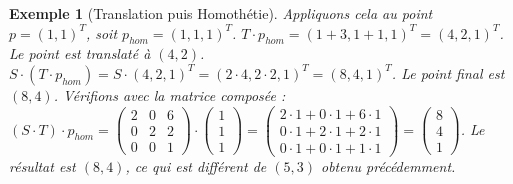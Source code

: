 \documentclass{article}
\newtheorem{example}{Exemple}
\begin{document}
\begin{example}[Translation puis Homothétie]
Appliquons cela au point $p = (1, 1)^T$, soit $p_{hom} = (1, 1, 1)^T$.
$T \cdot p_{hom} = (1+3, 1+1, 1)^T = (4, 2, 1)^T$. Le point est translaté à $(4, 2)$.
$S \cdot (T \cdot p_{hom}) = S \cdot (4, 2, 1)^T = (2\cdot4, 2\cdot2, 1)^T = (8, 4, 1)^T$. Le point final est $(8, 4)$.
Vérifions avec la matrice composée :
$(S \cdot T) \cdot p_{hom} = \begin{pmatrix} 2 & 0 & 6 \\ 0 & 2 & 2 \\ 0 & 0 & 1 \end{pmatrix} \cdot \begin{pmatrix} 1 \\ 1 \\ 1 \end{pmatrix} = \begin{pmatrix} 2\cdot1 + 0\cdot1 + 6\cdot1 \\ 0\cdot1 + 2\cdot1 + 2\cdot1 \\ 0\cdot1 + 0\cdot1 + 1\cdot1 \end{pmatrix} = \begin{pmatrix} 8 \\ 4 \\ 1 \end{pmatrix}$. Le résultat est $(8,4)$, ce qui est différent de $(5,3)$ obtenu précédemment.
\end{example}
\end{document}
